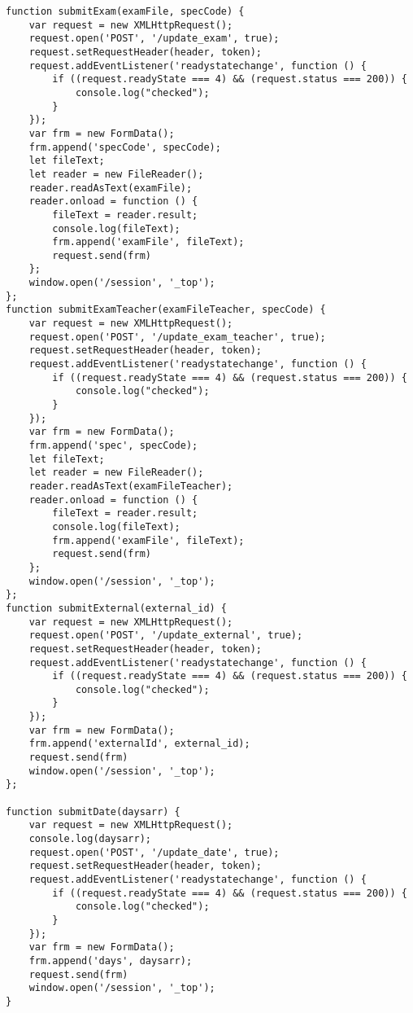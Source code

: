 \begin{lstlisting}
function submitExam(examFile, specCode) {
	var request = new XMLHttpRequest();
	request.open('POST', '/update_exam', true);
	request.setRequestHeader(header, token);
	request.addEventListener('readystatechange', function () {
		if ((request.readyState === 4) && (request.status === 200)) {
			console.log("checked");
		}
	});
	var frm = new FormData();
	frm.append('specCode', specCode);
	let fileText;
	let reader = new FileReader();
	reader.readAsText(examFile);
	reader.onload = function () {
		fileText = reader.result;
		console.log(fileText);
		frm.append('examFile', fileText);
		request.send(frm)
	};
	window.open('/session', '_top');
};
function submitExamTeacher(examFileTeacher, specCode) {
	var request = new XMLHttpRequest();
	request.open('POST', '/update_exam_teacher', true);
	request.setRequestHeader(header, token);
	request.addEventListener('readystatechange', function () {
		if ((request.readyState === 4) && (request.status === 200)) {
			console.log("checked");
		}
	});
	var frm = new FormData();
	frm.append('spec', specCode);
	let fileText;
	let reader = new FileReader();
	reader.readAsText(examFileTeacher);
	reader.onload = function () {
		fileText = reader.result;
		console.log(fileText);
		frm.append('examFile', fileText);
		request.send(frm)
	};
	window.open('/session', '_top');
};
function submitExternal(external_id) {
	var request = new XMLHttpRequest();
	request.open('POST', '/update_external', true);
	request.setRequestHeader(header, token);
	request.addEventListener('readystatechange', function () {
		if ((request.readyState === 4) && (request.status === 200)) {
			console.log("checked");
		}
	});
	var frm = new FormData();
	frm.append('externalId', external_id);
	request.send(frm)
	window.open('/session', '_top');
};

function submitDate(daysarr) {
	var request = new XMLHttpRequest();
	console.log(daysarr);
	request.open('POST', '/update_date', true);
	request.setRequestHeader(header, token);
	request.addEventListener('readystatechange', function () {
		if ((request.readyState === 4) && (request.status === 200)) {
			console.log("checked");
		}
	});
	var frm = new FormData();
	frm.append('days', daysarr);
	request.send(frm)
	window.open('/session', '_top');
}
	
\end{lstlisting}